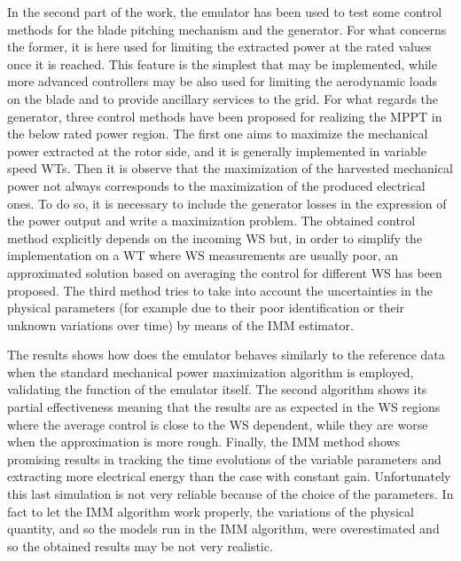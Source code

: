 In the second part of the work, the emulator has been used to test some control methods for the blade pitching mechanism and the generator. For what concerns the former, it is here used for limiting the extracted power at the rated values once it is reached. This feature is the simplest that may be implemented, while more advanced controllers may be also used for limiting the aerodynamic loads on the blade and to provide ancillary services to the grid. For what regards the generator, three control methods have been proposed for realizing the \acrfull{MPPT} in the below rated power region. The first one aims to maximize the mechanical power extracted at the rotor side, and it is generally implemented in variable speed WTs. Then it is observe that the maximization of the harvested mechanical power not always corresponds to the maximization of the produced electrical ones. To do so, it is necessary to include the generator losses in the expression of the power output and write a maximization problem. The obtained control method explicitly depends on the incoming WS but, in order to simplify the implementation on a WT where WS measurements are usually poor, an approximated solution based on averaging the control for different WS has been proposed. The third method tries to take into account the uncertainties in the physical parameters (for example due to their poor identification or their unknown variations over time) by means of the \acrfull{IMM} estimator. 

The results shows how does the emulator behaves similarly to the reference data when the standard mechanical power maximization algorithm is employed, validating the function of the emulator itself. The second algorithm shows its partial effectiveness meaning that the results are as expected in the WS regions where the average control is close to the WS dependent, while they are worse when the approximation is more rough. Finally, the IMM method shows promising results in tracking the time evolutions of the variable parameters and extracting more electrical energy than the case with constant gain. Unfortunately this last simulation is not very reliable because of the choice of the parameters. In fact to let the IMM algorithm work properly, the variations of the physical quantity, and so the models run in the IMM algorithm, were overestimated and so the obtained results may be not very realistic. 
